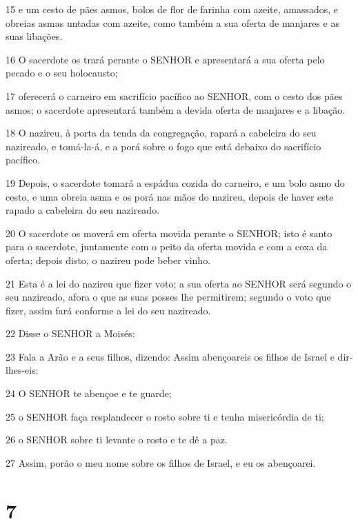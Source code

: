 \par 15 e um cesto de pães asmos, bolos de flor de farinha com azeite, amassados, e obreias asmas untadas com azeite, como também a sua oferta de manjares e as suas libações.
\par 16 O sacerdote os trará perante o SENHOR e apresentará a sua oferta pelo pecado e o seu holocausto;
\par 17 oferecerá o carneiro em sacrifício pacífico ao SENHOR, com o cesto dos pães asmos; o sacerdote apresentará também a devida oferta de manjares e a libação.
\par 18 O nazireu, à porta da tenda da congregação, rapará a cabeleira do seu nazireado, e tomá-la-á, e a porá sobre o fogo que está debaixo do sacrifício pacífico.
\par 19 Depois, o sacerdote tomará a espádua cozida do carneiro, e um bolo asmo do cesto, e uma obreia asma e os porá nas mãos do nazireu, depois de haver este rapado a cabeleira do seu nazireado.
\par 20 O sacerdote os moverá em oferta movida perante o SENHOR; isto é santo para o sacerdote, juntamente com o peito da oferta movida e com a coxa da oferta; depois disto, o nazireu pode beber vinho.
\par 21 Esta é a lei do nazireu que fizer voto; a sua oferta ao SENHOR será segundo o seu nazireado, afora o que as suas posses lhe permitirem; segundo o voto que fizer, assim fará conforme a lei do seu nazireado.
\par 22 Disse o SENHOR a Moisés:
\par 23 Fala a Arão e a seus filhos, dizendo: Assim abençoareis os filhos de Israel e dir-lhes-eis:
\par 24 O SENHOR te abençoe e te guarde;
\par 25 o SENHOR faça resplandecer o rosto sobre ti e tenha misericórdia de ti;
\par 26 o SENHOR sobre ti levante o rosto e te dê a paz.
\par 27 Assim, porão o meu nome sobre os filhos de Israel, e eu os abençoarei.

\chapter{7}

